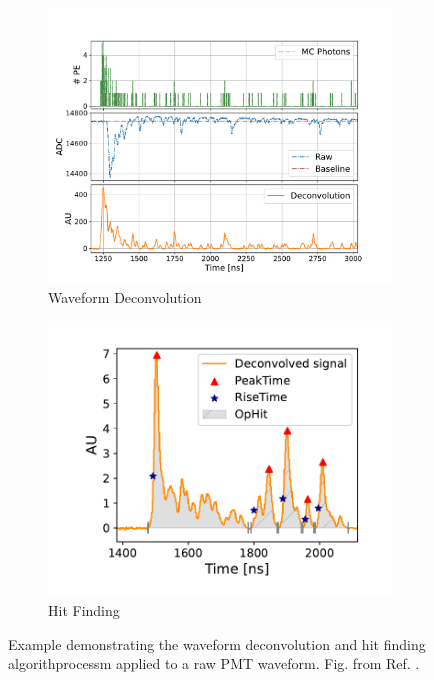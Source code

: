 \begin{figure}[tbp!]
        \centering
        \begin{subfigure}[b]{0.59\textwidth}
            \centering
            \includegraphics[width=\textwidth]{pds_reco_deconvolution}
            \caption{Waveform Deconvolution}
            \label{fig:pds_reco_deconvolution}
        \end{subfigure}
        \hfill
        \begin{subfigure}[b]{0.4\textwidth}  
            \centering 
            \includegraphics[width=\textwidth]{pds_reco_hit_finding}
            \caption{Hit Finding}
            \label{fig:pds_reco_hit_finding}
        \end{subfigure}
        \caption[pds_reco]{
	Example demonstrating the waveform deconvolution and hit finding algorithprocessm applied to a raw PMT waveform. 
	Fig. from Ref. \cite{sbnd_pds_paper}.
	}
        \label{fig:pds_reco}
\end{figure}

